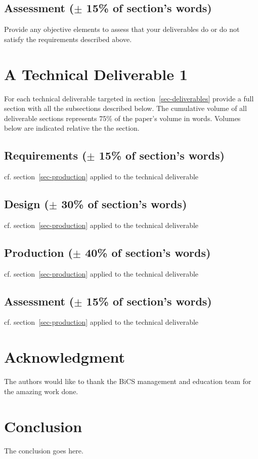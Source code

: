 \documentclass[conference,compsoc]{IEEEtran}
\begin{document}
\subsection{Assessment ($\pm$ 15\% of section's words)}
Provide any objective elements to assess that your deliverables do or do not satisfy the requirements described above. 

\section{ A Technical Deliverable 1}
For each technical deliverable targeted in section~\ref{sec-deliverables} provide a full section with all the subsections described below.
The cumulative volume of all deliverable sections represents 75\% of the paper's volume in words. Volumes below are indicated relative the the section.
\label{sec-production}
\subsection{Requirements ($\pm$ 15\% of section's words)}
cf. section~\ref{sec-production} applied to the technical deliverable
\subsection{Design ($\pm$ 30\% of section's words)}
cf. section~\ref{sec-production} applied to the technical deliverable
\subsection{Production ($\pm$ 40\% of section's words)}
cf. section~\ref{sec-production} applied to the technical deliverable
\subsection{Assessment ($\pm$ 15\% of section's words)}
cf. section~\ref{sec-production} applied to the technical deliverable


\section*{Acknowledgment}
The authors would like to thank the BiCS management and education team for the amazing work done.


\section{Conclusion}
The conclusion goes here.
\end{document}
